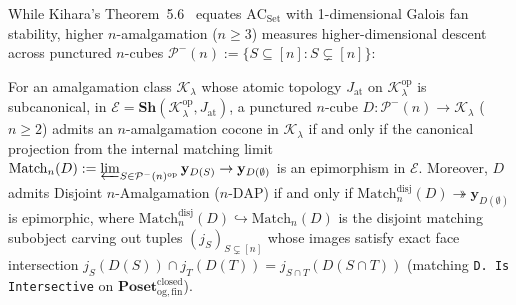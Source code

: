 While Kihara's Theorem~5.6~\cite{Kihara26} equates $\mathrm{AC}_{\mathrm{Set}}$ with 1-dimensional Galois fan stability, higher $n$-amalgamation ($n \ge 3$) measures higher-dimensional descent across punctured $n$-cubes $\mathcal{P}^-(n) := \{S \subseteq [n] : S \subsetneq [n]\}$:

\begin{proposition}\label{prop:matching-amalgamation}%
%
%
For an amalgamation class $\mathcal{K}_\lambda$ whose atomic topology $J_{\mathrm{at}}$ on $\mathcal{K}_\lambda^{\mathrm{op}}$ is subcanonical, in $\mathcal{E} = \mathbf{Sh}(\mathcal{K}_\lambda^{\mathrm{op}}, J_{\mathrm{at}})$, a punctured $n$-cube $D : \mathcal{P}^-(n) \to \mathcal{K}_\lambda$ ($n \ge 2$) admits an $n$-amalgamation cocone in $\mathcal{K}_\lambda$ if and only if the canonical projection from the internal matching limit $\mathrm{Match}_n(D) := \varprojlim_{S \in \mathcal{P}^-(n)^{\mathrm{op}}} \mathbf{y}_{D(S)} \to \mathbf{y}_{D(\emptyset)}$ is an epimorphism in $\mathcal{E}$. Moreover, $D$ admits Disjoint $n$-Amalgamation ($n$-$\mathrm{DAP}$) if and only if $\mathrm{Match}_n^{\mathrm{disj}}(D) \twoheadrightarrow \mathbf{y}_{D(\emptyset)}$ is epimorphic, where $\mathrm{Match}_n^{\mathrm{disj}}(D) \hookrightarrow \mathrm{Match}_n(D)$ is the disjoint matching subobject carving out tuples $(j_S)_{S \subsetneq [n]}$ whose images satisfy exact face intersection $j_S(D(S)) \cap  j_T(D(T)) =  j_{S \cap T}(D(S \cap T))$ (matching \texttt{D. Is Intersective} on $\mathbf{Poset}_{\mathrm{og,fin}}^{\mathrm{closed}}$).
\end{proposition}

